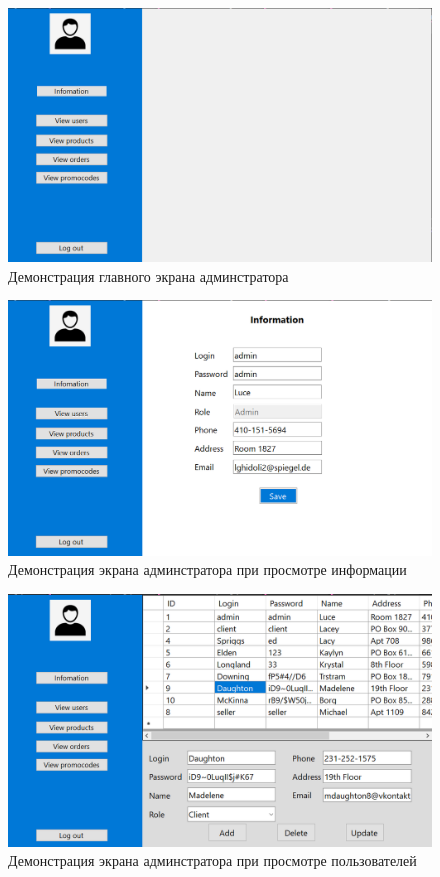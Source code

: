 \begin{figure}[h]
	\centering
	\includegraphics[height=0.4\textheight]{img/admin_0.png}
	\caption{Демонстрация главного экрана админстратора}
	\label{img:ex2}
\end{figure}

\begin{figure}[h]
	\centering
	\includegraphics[height=0.4\textheight]{img/admin_1.png}
	\caption{Демонстрация экрана админстратора при просмотре информации}
	\label{img:ex3}
\end{figure}

\begin{figure}[h]
	\centering
	\includegraphics[height=0.4\textheight]{img/admin_2.png}
	\caption{Демонстрация экрана админстратора при просмотре пользователей}
	\label{img:ex4}
\end{figure}

